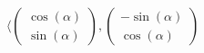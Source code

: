 \documentclass[preview]{standalone}
\begin{document}
\begin{align*}
\langle \begin{pmatrix} \cos(\alpha) \\ \sin(\alpha) \end{pmatrix}, \begin{pmatrix} -\sin(\alpha) \\ \cos(\alpha) \end{pmatrix}
\end{align*}
\end{document}
